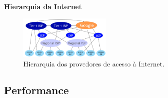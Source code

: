     \vspace{1cm}
    \textbf{Hierarquia da Internet}

    \begin{figure}[H]
        \centering
        \includegraphics[width=0.4\textwidth]{img/cap-01/hierarquia.png}
        \caption{Hierarquia dos provedores de acesso à Internet.}
    \end{figure}

   \subsection{Performance}

